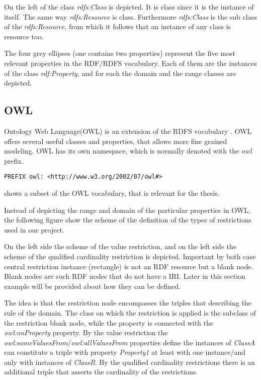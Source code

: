 On the left of  the class \textit{rdfs:Class} is depicted. It is class since it is the instance of itself. The same way \textit{rdfs:Resource} is class. Furthermore \textit{rdfs:Class} is the sub class of the \textit{rdfs:Resource}, from which it follows that an instance of any class is resource too. 

The four grey ellipses (one contains two properties) represent the five most relevant properties in the RDF/RDFS vocabulary. Each of them are the instances of the class \textit{rdf:Property}, and for each the domain and the range classes are depicted.

\subsection{OWL}

Ontology Web Language(OWL) is an extension of the RDFS vocabulary \cite{Dean:04:OWO}. OWL offers several useful classes and properties, that allows more fine grained modeling. OWL has its own namespace, which is normally denoted with the \textit{owl} prefix.

\begin{lstlisting}[basicstyle=\footnotesize, captionpos=b, caption=OWL namespace, label=lst:sparql, belowskip=1em, aboveskip=2em,
frame=single]
PREFIX owl: <http://www.w3.org/2002/07/owl#>
\end{lstlisting}


 shows a subset of the OWL vocabulary, that is relevant for the thesis.



Instead of depicting the range and domain of the particular properties in OWL, the following figure show the scheme of the definition of the types of restrictions used in our project.


On the left side the scheme of the value restriction, and on the left side the scheme of the qualified cardinality restriction is depicted. Important by both case central restriction instance (rectangle) is not an RDF resource but a blank node. Blank nodes are such RDF nodes that do not have a IRI. Later in this section example will be provided about how they can be defined. 

The idea is that the restriction node encompasses the triples that describing the rule of the domain. The class on which the restriction is applied is the subclass of the restriction blank node, while the property is connected with the \textit{owl:onProperty} property. By the value restriction the \textit{owl:someValuesFrom}/\textit{owl:allValuesFrom} properties define the instances of \textit{ClassA} can constitute a triple with property \textit{Property1} at least with one instance/and only with instances of \textit{ClassB}. By the qualified cardinality restrictions there is an additional triple that asserts the cardinality of the restrictions.


